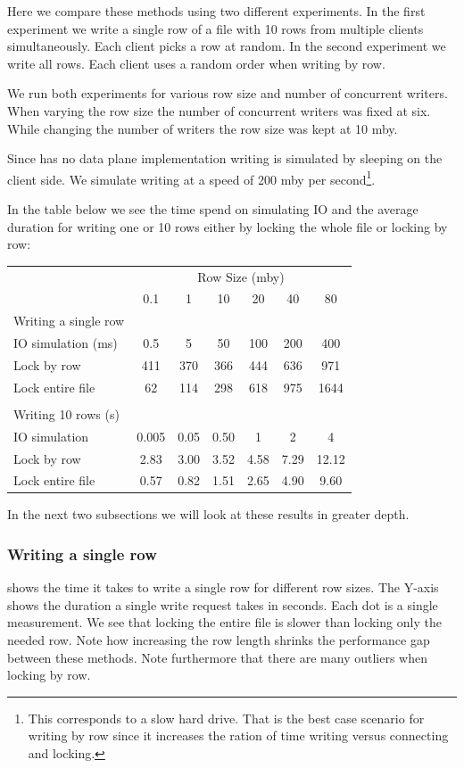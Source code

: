Here we compare these methods using two different experiments. In the first experiment we write a single row of a file with 10 rows from multiple clients simultaneously. Each client picks a row at random. In the second experiment we write all rows. Each client uses a random order when writing by row.

We run both experiments for various row size and number of concurrent writers. When varying the row size the number of concurrent writers was fixed at six. While changing the number of writers the row size was kept at 10 \ac{mby}.

Since \name{} has no data plane implementation writing is simulated by sleeping on the client side. We simulate writing at a speed of 200 \ac{mby} per second\footnote{This corresponds to a slow hard drive. That is the best case scenario for writing by row since it increases the ration of time writing versus connecting and locking.}.

In the table below we see the time spend on simulating IO and the average duration for writing one or 10 rows either by locking the whole file or locking by row:
%
\begin{tabular}{lcccccc} \toprule
	& \multicolumn{6}{c}{Row Size (\ac{mby})} \\ \cmidrule(r){2-7}
	                   & 0.1 & 1 & 10 & 20 & 40 & 80 \\ \midrule
	Writing a single row  \\ \cmidrule(r){1-1}
	IO simulation (ms) & 0.5          & 5          & 50          & 100         & 200         & 400 \\
	Lock by row & 411 & 370 & 366 & 444 & 636 & 971\\
	Lock entire file & 62 & 114 & 298 & 618 & 975 & 1644 \\
\smallskip \\
	Writing 10 rows (s)\\ \cmidrule(r){1-1}
	IO simulation & 0.005          & 0.05          & 0.50          & 1         & 2         & 4 \\
	Lock by row & 2.83         & 3.00       & 3.52        & 4.58        & 7.29        & 12.12 \\
	Lock entire file & 0.57         & 0.82       & 1.51        & 2.65        & 4.90        & 9.60 \\ \bottomrule
\end{tabular}
%
In the next two subsections we will look at these results in greater depth.
%
\subsubsection*{Writing a single row}
 shows the time it takes to write a single row for different row sizes. The Y-axis shows the duration a single write request takes in seconds. Each dot is a single measurement. We see that locking the entire file is slower than locking only the needed row. Note how increasing the row length shrinks the performance gap between these methods. Note furthermore that there are many outliers when locking by row.

